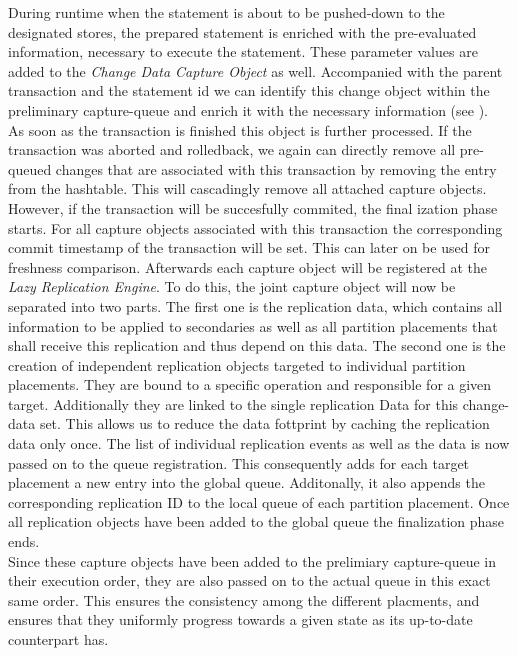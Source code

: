 During runtime when the statement is about to be pushed-down to the designated stores, the prepared statement is enriched with the pre-evaluated information, 
necessary to execute the statement. These parameter values are added to the \emph{Change Data Capture Object} as well. 
Accompanied with the parent transaction and the statement id we can identify this change object within the preliminary capture-queue 
and enrich it with the necessary information (see ).\\
As soon as the transaction is finished this object is further processed. If the transaction was aborted and rolledback, we again can directly remove all pre-queued changes 
that are associated with this transaction by removing the entry from the hashtable. This will cascadingly remove all attached capture objects.\\
However, if the transaction will be succesfully commited, the final ization phase starts. For all capture objects associated with this transaction the corresponding commit timestamp of the transaction
will be set. This can later on be used for freshness comparison. Afterwards each capture object will be registered at the \emph{Lazy Replication Engine}. 
To do this, the joint capture object will now be separated into two parts. The first one is the replication data, which contains all information to be applied to 
secondaries as well as all partition placements that shall receive this replication and thus depend on this data. The second one is the creation of independent replication 
objects targeted to individual partition placements. They are bound to a specific operation and responsible for a given target. Additionally they are linked to the single replication Data for this change-data set.
This allows us to reduce the data fottprint by caching the replication data only once. The list of individual replication events as well as the data is now passed on to the
queue registration. This consequently adds for each target placement a new entry into the global queue. Additonally, it also appends the corresponding replication ID to 
the local queue of each partition placement. Once all replication objects have been added to the global queue the finalization phase ends.\\
Since these capture objects have been added to the prelimiary capture-queue in their execution order, they are also passed on to the actual queue in this exact same order.
This ensures the consistency among the different placments, and ensures that they uniformly progress towards a given state as its up-to-date counterpart has.


